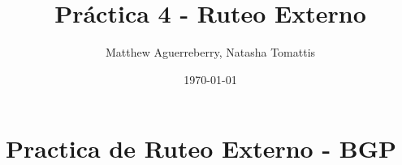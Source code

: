 \documentclass[letterpaper,12pt]{article}
\begin{document}
\title{Práctica 4 - Ruteo Externo}
\author{Matthew Aguerreberry, Natasha Tomattis}
\date{\today}
\maketitle



\section{Practica de Ruteo Externo - BGP}
			
\end{document}
